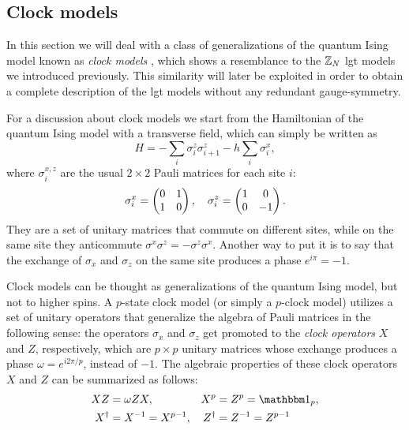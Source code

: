\subsection{Clock models}%
\label{sub:clock_models}

In this section we will deal with a class of generalizations of the quantum Ising model known as \emph{clock models} \cite{fendley2014parafermions, baxter1989clock}, which shows a resemblance to the $\mathbb{Z}_N$ \ac{lgt} models we introduced previously.
This similarity will later be exploited in order to obtain a complete description of the \ac{lgt} models without any redundant gauge-symmetry.

For a discussion about clock models we start from the Hamiltonian of the quantum Ising model with a transverse field, which can simply be written as
\begin{equation}
    H = - \sum_{i} \sigma^z_i \sigma^z_{i+1} - h \sum_{i} \sigma^x_i,
    \label{eq:ising_hamiltonian_duality}
\end{equation}
where $\sigma^{x,z}_i$ are the usual $2 \times 2$ Pauli matrices for each site $i$:
\begin{equation}
    \sigma^x_i = \pmqty{ 0 & 1 \\ 1 &  0 }, \quad
    \sigma^z_i = \pmqty{ 1 & 0 \\ 0 & -1 }.
\end{equation}
They are a set of unitary matrices that commute on different sites, while on the same site they anticommute $\sigma^x \sigma^z = - \sigma^z \sigma^x$.
Another way to put it is to say that the exchange of $\sigma_x$ and $\sigma_z$ on the same site produces a phase $e^{i \pi} = -1$.

Clock models can be thought as generalizations of the quantum Ising model, but not to higher spins.
A $p$-state clock model (or simply a $p$-clock model) utilizes a set of unitary operators that generalize the algebra of Pauli matrices in the following sense:
the operators $\sigma_x$ and $\sigma_z$ get promoted to the \emph{clock operators} $X$ and $Z$, respectively, which are $p \times p$ unitary matrices whose exchange produces a phase $\omega = e^{i 2 \pi / p}$, instead of $-1$.
The algebraic properties of these clock operators $X$ and $Z$ can be summarized as follows:
\begin{equation}
    \begin{aligned}
        X Z & = \omega Z X, &
        X^p & =  Z^p = \identity_p, \\
        X^\dagger & = X^{-1} = X^{p-1}, &
        Z^\dagger & = Z^{-1} = Z^{p-1}
    \end{aligned}
    \label{eq:clock_operator_algebra}
\end{equation}

